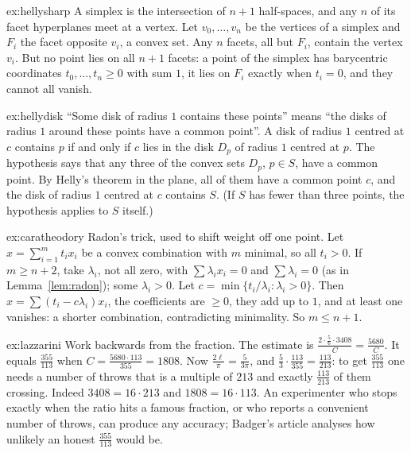 \begin{solution}{ex:hellysharp}
\idea A simplex is the intersection of $n+1$ half-spaces, and any $n$ of its facet hyperplanes meet at a vertex.
\writeup Let $v_0,\dots,v_n$ be the vertices of a simplex and $F_i$ the facet opposite $v_i$, a convex set. Any $n$ facets, all but $F_i$, contain the vertex $v_i$.
But no point lies on all $n+1$ facets: a point of the simplex has barycentric coordinates $t_0,\dots,t_n\ge0$ with sum $1$, it lies on $F_i$ exactly when $t_i=0$,
and they cannot all vanish.
\end{solution}

\begin{solution}{ex:hellydisk}
\idea ``Some disk of radius $1$ contains these points'' means ``the disks of radius $1$ around these points have a common point''.
\writeup A disk of radius $1$ centred at $c$ contains $p$ if and only if $c$ lies in the disk $D_p$ of radius $1$ centred at $p$. The hypothesis says that any three of the
convex sets $D_p$, $p\in S$, have a common point. By Helly's theorem in the plane, all of them have a common point $c$, and the disk of radius $1$ centred at $c$
contains $S$. (If $S$ has fewer than three points, the hypothesis applies to $S$ itself.)
\end{solution}

\begin{solution}{ex:caratheodory}
\idea Radon's trick, used to shift weight off one point.
\writeup Let $x=\sum_{i=1}^mt_ix_i$ be a convex combination with $m$ minimal, so all $t_i>0$. If $m\ge n+2$, take $\lambda_i$, not all zero, with $\sum\lambda_ix_i=0$ and
$\sum\lambda_i=0$ (as in Lemma~\ref{lem:radon}); some $\lambda_i>0$. Let $c=\min\{t_i/\lambda_i:\lambda_i>0\}$. Then $x=\sum(t_i-c\lambda_i)x_i$, the coefficients are
$\ge0$, they add up to $1$, and at least one vanishes: a shorter combination, contradicting minimality. So $m\le n+1$.
\end{solution}

\begin{solution}{ex:lazzarini}
\idea Work backwards from the fraction.
\writeup The estimate is $\frac{2\cdot\frac56\cdot3408}C=\frac{5680}C$. It equals $\frac{355}{113}$ when $C=\frac{5680\cdot113}{355}=1808$. Now $\frac{2\ell}\pi=\frac5{3\pi}$, and
$\frac53\cdot\frac{113}{355}=\frac{113}{213}$: to get $\frac{355}{113}$ one needs a number of throws that is a multiple of $213$ and exactly $\frac{113}{213}$ of them
crossing. Indeed $3408=16\cdot213$ and $1808=16\cdot113$. An experimenter who stops exactly when the ratio hits a famous fraction, or who reports a convenient
number of throws, can produce any accuracy; Badger's article analyses how unlikely an honest $\frac{355}{113}$ would be.
\end{solution}

